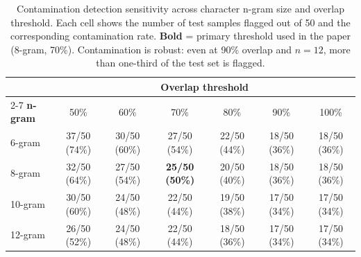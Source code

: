 
\begin{table}[t]
\centering
\small
\begin{tabular}{@{}lcccccc@{}}
\toprule
\textbf{} & \multicolumn{6}{c}{\textbf{Overlap threshold}} \\
\cmidrule(l){2-7}
\textbf{n-gram} & 50\% & 60\% & 70\% & 80\% & 90\% & 100\% \\
\midrule
6-gram & 37/50 (74\%) & 30/50 (60\%) & 27/50 (54\%) & 22/50 (44\%) & 18/50 (36\%) & 18/50 (36\%) \\
8-gram & 32/50 (64\%) & 27/50 (54\%) & \textbf{25/50 (50\%)} & 20/50 (40\%) & 18/50 (36\%) & 18/50 (36\%) \\
10-gram & 30/50 (60\%) & 24/50 (48\%) & 22/50 (44\%) & 19/50 (38\%) & 17/50 (34\%) & 17/50 (34\%) \\
12-gram & 26/50 (52\%) & 24/50 (48\%) & 22/50 (44\%) & 18/50 (36\%) & 17/50 (34\%) & 17/50 (34\%) \\
\bottomrule
\end{tabular}
\caption{Contamination detection sensitivity across character n-gram size and overlap threshold. Each cell shows the number of test samples flagged out of 50 and the corresponding contamination rate. \textbf{Bold} = primary threshold used in the paper (8-gram, 70\%). Contamination is robust: even at 90\% overlap and $n=12$, more than one-third of the test set is flagged.}
\label{tab:ngram-sensitivity}
\end{table}
